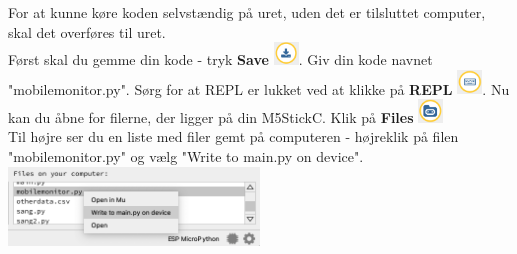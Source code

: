 \documentclass{ucph-handout}
\begin{document}
\begin{exercisebox}[adjusted title=Kode til overvågning]
For at kunne køre koden selvstændig på uret, uden det er tilsluttet computer, skal det overføres til uret.\\
Først skal du gemme din kode - tryk \textbf{Save} \includegraphics[width=0.05\textwidth]{ikoner/save.png}. Giv din kode navnet "mobilemonitor.py". Sørg for at REPL er lukket ved at klikke på \textbf{REPL} \includegraphics[width=0.05\textwidth]{ikoner/REPL.png}. Nu kan du åbne for filerne, der ligger på din M5StickC. Klik på \textbf{Files} \includegraphics[width=0.05\textwidth]{ikoner/files.png}\\

Til højre ser du en liste med filer gemt på computeren - højreklik på filen "mobilemonitor.py" og vælg "Write to main.py on device". \\

\includegraphics[width=0.50\textwidth]{billeder/wwritetomain.png}

\end{exercisebox}

\newpage
\end{document}
